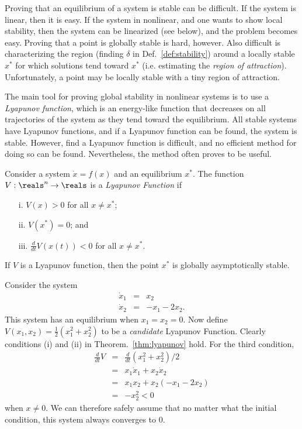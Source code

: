 Proving that an equilibrium of a system is stable can be difficult. If
the system is linear, then it is easy. If the system in nonlinear, and
one wants to show local stability, then the system can be linearized
(see below), and the problem becomes easy. Proving that a point is
globally stable is hard, however. Also difficult is characterizing the
region (finding $\delta$ in Def.~\ref{def:stability}) around a locally
stable $x^*$ for which solutions tend toward $x^*$ (i.e. estimating
the {\em region of attraction}). Unfortunately, a point may be locally
stable with a tiny region of attraction.

The main tool for proving global stability in nonlinear systems is
to use a {\em Lyapunov function}, which is an energy-like function that
decreases on all trajectories of the system as they tend toward the
equilibrium. All stable systems have Lyapunov functions, and if a
Lyapunov function can be found, the system is stable. However, find a
Lyapunov function is difficult, and no efficient method for doing so
can be found. Nevertheless, the method often proves to be useful. 

\begin{theorem}  \label{thm:lyapunov}
  Consider a system $\dot x = f(x)$ and an equilibrium $x^*$. The
  function $V : \reals^n \rightarrow \reals$ is a {\em Lyapunov Function} if
\begin{enumerate}
\item[i.] $V(x) > 0$ for all $x \neq x^*$;
\item[ii.] $V(x^*) = 0$; and
\item[iii.] $\frac{d}{dt} V ( x ( t ) ) < 0$ for all $x \neq x^*$.
\end{enumerate}
If $V$ is a Lyapunov function, then the point $x^*$ is globally
asymptotically stable.
\end{theorem}

\begin{example} \label{ex:lyapunov}
Consider the system
%
\begin{eqnarray*}
\dot x_1 & = & x_2 \\
\dot x_2 & = & -x_1 - 2 x_2 .
\end{eqnarray*}
%
This system has an equilibrium when $x_1=x_2=0$. Now define
$V(x_1,x_2) = \frac{1}{2} ( x_1^2 + x_2^2 )$ to be a {\em candidate}
Lyapunov Function. Clearly conditions (i) and (ii) in
Theorem.~\ref{thm:lyapunov} hold. For the third condition,
%
\begin{eqnarray*}
\frac{d}{dt} V & = & \frac{d}{dt} ( x_1^2 + x_2^2 ) / 2 \\
               & = & x_1 \dot x_1 + x_2 \dot x_2 \\
               & = & x_1 x_2 + x_2 ( -x_1 - 2 x_2 ) \\
               & = & - x_2^2 < 0 
\end{eqnarray*}
%
when $x \neq 0$. We can therefore safely assume that no matter what
the initial condition, this system always converges to $0$. \enx
\end{example}

